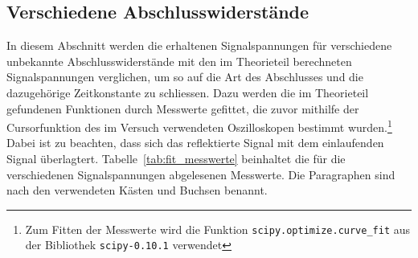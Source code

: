\subsection{Verschiedene Abschlusswiderstände}
%
In diesem Abschnitt werden die erhaltenen Signalspannungen für
verschiedene unbekannte Abschlusswiderstände mit den im Theorieteil
berechneten Signalspannungen verglichen, um so auf die Art des
Abschlusses und die dazugehörige Zeitkonstante zu schliessen.  Dazu
werden die im Theorieteil gefundenen Funktionen durch Messwerte
gefittet, die zuvor mithilfe der Cursorfunktion des im Versuch
verwendeten Oszilloskopen bestimmt wurden.\footnote{Zum Fitten der
  Messwerte wird die Funktion \texttt{scipy.optimize.curve\_fit} aus der
  Bibliothek \texttt{scipy-0.10.1} verwendet} Dabei ist zu beachten,
dass sich das reflektierte Signal mit dem einlaufenden Signal
überlagtert.  Tabelle~\ref{tab:fit_messwerte} beinhaltet die für die
verschiedenen Signalspannungen abgelesenen Messwerte.  Die Paragraphen
sind nach den verwendeten Kästen und Buchsen benannt.

